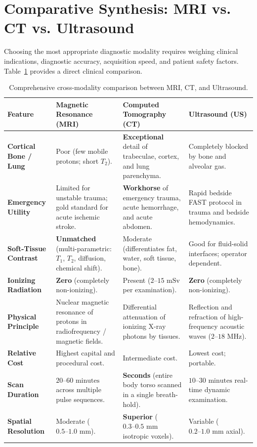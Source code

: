 \documentclass[11pt,a4paper]{article}
\begin{document}
\section{Comparative Synthesis: MRI vs. CT vs. Ultrasound}

Choosing the most appropriate diagnostic modality requires weighing clinical indications, diagnostic accuracy, acquisition speed, and patient safety factors. Table~\ref{tab:modality_comparison} provides a direct clinical comparison.

\begin{table}[htbp]
\centering
\small
\setlength{\tabcolsep}{4pt}
\renewcommand{\arraystretch}{1.25}
\begin{tabular}{p{2.5cm}p{3.8cm}p{3.9cm}p{4.2cm}}
\toprule
\textbf{Feature} & \textbf{Magnetic Resonance (MRI)} & \textbf{Computed Tomography (CT)} & \textbf{Ultrasound (US)} \\
\midrule
\textbf{Cortical Bone / Lung} & Poor (few mobile protons; short $T_2$). & \textbf{Exceptional} detail of trabeculae, cortex, and lung parenchyma. & Completely blocked by bone and alveolar gas. \\
\textbf{Emergency Utility} & Limited for unstable trauma; gold standard for acute ischemic stroke. & \textbf{Workhorse} of emergency trauma, acute hemorrhage, and acute abdomen. & Rapid bedside FAST protocol in trauma and bedside hemodynamics. \\
\textbf{Soft-Tissue Contrast} & \textbf{Unmatched} (multi-parametric: $T_1$, $T_2$, diffusion, chemical shift). & Moderate (differentiates fat, water, soft tissue, bone). & Good for fluid-solid interfaces; operator dependent. \\
\textbf{Ionizing Radiation} & \textbf{Zero} (completely non-ionizing). & Present ($2\text{--}15\text{ mSv}$ per examination). & \textbf{Zero} (completely non-ionizing). \\
\textbf{Physical Principle} & Nuclear magnetic resonance of protons in radiofrequency / magnetic fields. & Differential attenuation of ionizing X-ray photons by tissues. & Reflection and refraction of high-frequency acoustic waves ($2\text{--}18\text{ MHz}$). \\
\textbf{Relative Cost} & Highest capital and procedural cost. & Intermediate cost. & Lowest cost; portable. \\
\textbf{Scan Duration} & $20\text{--}60\text{ minutes}$ across multiple pulse sequences. & \textbf{Seconds} (entire body torso scanned in a single breath-hold). & $10\text{--}30\text{ minutes}$ real-time dynamic examination. \\
\textbf{Spatial Resolution} & Moderate ($0.5\text{--}1.0\text{ mm}$). & \textbf{Superior} ($0.3\text{--}0.5\text{ mm}$ isotropic voxels). & Variable ($0.2\text{--}1.0\text{ mm}$ axial). \\
\bottomrule
\end{tabular}
\caption{Comprehensive cross-modality comparison between MRI, CT, and Ultrasound.}
\label{tab:modality_comparison}
\end{table}
\end{document}
